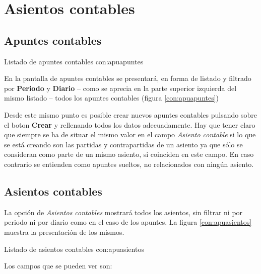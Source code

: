 \section{Asientos contables}

\subsection{Apuntes contables}
{Listado de apuntes contables}
{con:apuapuntes}

En la pantalla de apuntes contables se presentará, en forma de listado y filtrado por \textbf{Periodo} y \textbf{Diario} -- como se aprecia en la parte superior izquierda del mismo listado -- todos los apuntes contables (figura \ref{con:apuapuntes})



Desde este mismo punto es posible crear nuevos apuntes contables pulsando sobre el boton \textbf{Crear} y rellenando todos los datos adecuadamente. Hay que tener claro que siempre se ha de situar el mismo valor en el campo \emph{Asiento contable} si lo que se está creando son las partidas y contrapartidas de un asiento ya que sólo se consideran como parte de un mismo asiento, si coinciden en este campo. En caso contrario se entienden como apuntes sueltos, no relacionados con ningún asiento.	



\subsection{Asientos contables}

La opción de \emph{Asientos contables} mostrará todos los asientos, sin filtrar ni por periodo ni por diario como en el caso de los apuntes. La figura \ref{con:apuasientos} muestra la presentación de los mismos.

{Listado de asientos contables}
{con:apuasientos}

Los campos que se pueden ver son:

